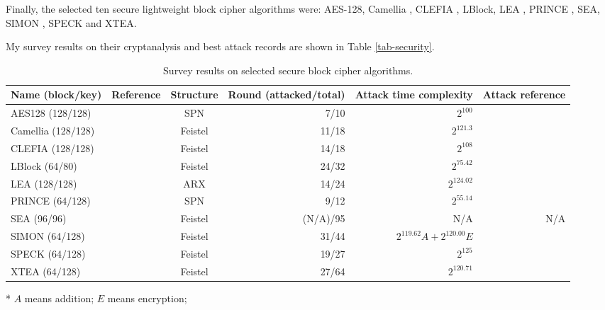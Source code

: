\documentclass[sigconf, review=false]{acmart}
\begin{document}
Finally, the selected ten secure lightweight block cipher algorithms were:
AES-128, Camellia \cite{aoki2000camellia}, CLEFIA \cite{shirai2007128}, LBlock, LEA \cite{hong2013lea},
PRINCE \cite{borghoff2012prince}, SEA, SIMON \cite{beaulieu2015simon}, SPECK and XTEA.

My survey results on their cryptanalysis and best attack records are shown in Table \ref{tab-security}.

\begin{table}[]
\centering
\begin{threeparttable}
\caption{Survey results on selected secure block cipher algorithms.}
\begin{tabular}{lrcrrr}
    \toprule
Name (block/key)   & Reference & Structure & Round (attacked/total) & Attack time complexity & Attack reference \\
    \midrule
AES128 (128/128) & \cite{pub2001197} & SPN & 7/10 & $2^{100}$ & \cite{derbez2013improved} \\
Camellia (128/128) & \cite{aoki2000camellia} & Feistel & 11/18 & $2^{121.3}$ & \cite{li2015meet} \\
CLEFIA (128/128) & \cite{shirai2007128} & Feistel & 14/18 & $2^{108}$ & \cite{li2015meet} \\
LBlock (64/80) & \cite{wu2011lblock} & Feistel   & 24/32 & $2^{75.42}$ & \cite{xie2017related} \\
LEA (128/128) & \cite{hong2013lea} & ARX & 14/24 & $2^{124.02}$ & \cite{song2016automatic} \\
PRINCE (64/128) & \cite{borghoff2012prince} & SPN & 9/12 & $2^{55.14}$ & \cite{cheng2017multidimensional} \\
SEA (96/96) & \cite{standaert2006sea} & Feistel & (N/A)/95 & N/A & N/A \\
SIMON (64/128) & \cite{beaulieu2015simon} & Feistel & 31/44 & $2^{119.62}A+2^{120.00}E$\tnote{*} & \cite{chen2016improved} \\
SPECK (64/128) & \cite{beaulieu2015simon} & Feistel & 19/27 & $2^{125}$ & \cite{dinur2014improved} \\
XTEA (64/128) & \cite{wheeler1998correction} & Feistel & 27/64 & $2^{120.71}$ & \cite{bogdanov2012zero} \\
    \bottomrule
\end{tabular}
\begin{tablenotes}
\item [*] $A$ means addition; $E$ means encryption;
\end{tablenotes}
\end{threeparttable}
\end{table}
\end{document}
